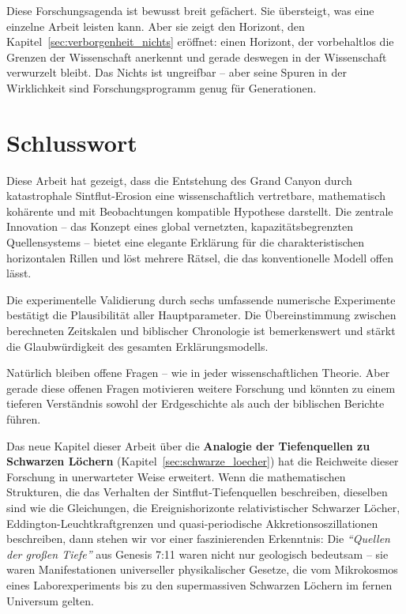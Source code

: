 ﻿\documentclass[12pt,a4paper]{report}
\begin{document}
Diese Forschungsagenda ist bewusst breit gefächert. Sie übersteigt, was eine einzelne Arbeit leisten kann. Aber sie zeigt den Horizont, den Kapitel~\ref{sec:verborgenheit_nichts} eröffnet: einen Horizont, der vorbehaltlos die Grenzen der Wissenschaft anerkennt und gerade deswegen in der Wissenschaft verwurzelt bleibt. Das Nichts ist ungreifbar -- aber seine Spuren in der Wirklichkeit sind Forschungsprogramm genug für Generationen.

\section{Schlusswort}

Diese Arbeit hat gezeigt, dass die Entstehung des Grand Canyon durch katastrophale Sintflut-Erosion eine wissenschaftlich vertretbare, mathematisch kohärente und mit Beobachtungen kompatible Hypothese darstellt. Die zentrale Innovation -- das Konzept eines global vernetzten, kapazitätsbegrenzten Quellensystems -- bietet eine elegante Erklärung für die charakteristischen horizontalen Rillen und löst mehrere Rätsel, die das konventionelle Modell offen lässt.

Die experimentelle Validierung durch sechs umfassende numerische Experimente bestä\-tigt die Plausibilität aller Hauptparameter. Die Übereinstimmung zwischen berechneten Zeitskalen und biblischer Chronologie ist bemerkenswert und stärkt die Glaubwürdigkeit des gesamten Erklärungsmodells.

Natürlich bleiben offene Fragen -- wie in jeder wissenschaftlichen Theorie. Aber gerade diese offenen Fragen motivieren weitere Forschung und könnten zu einem tieferen Verständnis sowohl der Erdgeschichte als auch der biblischen Berichte führen.

\medskip

Das neue Kapitel dieser Arbeit über die \textbf{Analogie der Tiefenquellen zu Schwarzen Löchern} (Kapitel~\ref{sec:schwarze_loecher}) hat die Reichweite dieser Forschung in unerwarteter Weise erweitert. Wenn die mathematischen Strukturen, die das Verhalten der Sintflut-Tiefenquellen beschreiben, dieselben sind wie die Gleichungen, die Ereignishorizonte relativistischer Schwarzer Löcher, Eddington-Leuchtkraftgrenzen und quasi-periodische Akkretionsoszillationen beschreiben, dann stehen wir vor einer faszinierenden Erkenntnis: Die \textit{``Quellen der großen Tiefe''} aus Genesis 7:11 waren nicht nur geologisch bedeutsam -- sie waren Manifestationen universeller physikalischer Gesetze, die vom Mikrokosmos eines Laborexperiments bis zu den supermassiven Schwarzen Löchern im fernen Universum gelten.
\end{document}
